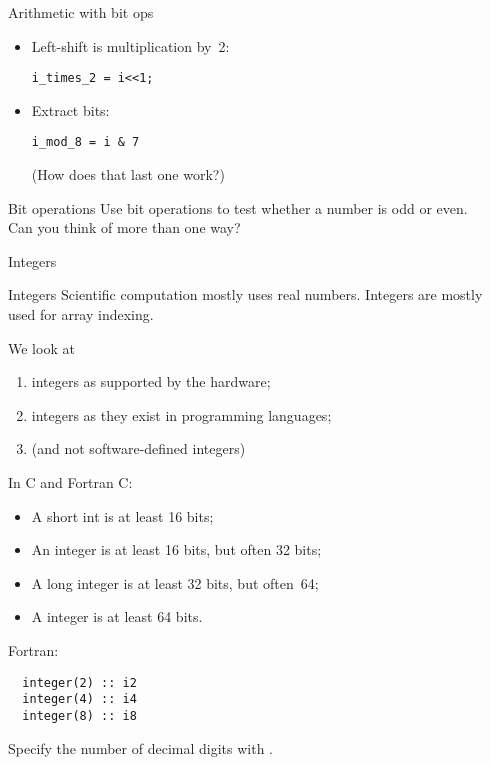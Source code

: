 \begin{numberedframe}{Arithmetic with bit ops}
  \begin{itemize}
  \item Left-shift is multiplication by~2:\\
\begin{lstlisting}
i_times_2 = i<<1;
\end{lstlisting}
\item Extract bits:
\begin{lstlisting}
i_mod_8 = i & 7
\end{lstlisting}
(How does that last one work?)
  \end{itemize}

\end{numberedframe}

\begin{exercise}{Bit operations}
  \label{ex:bit-even}
  Use bit operations to test whether a number is odd or even.\\
  Can you think of more than one way?
\end{exercise}

 {Integers}

\begin{numberedframe}{Integers}
Scientific computation mostly uses real numbers. Integers
are mostly used for array indexing.

We look at
\begin{enumerate}
\item integers as supported by the hardware;
\item integers as they exist in programming languages;
\item (and not software-defined integers)
\end{enumerate}
\end{numberedframe}

\begin{numberedframe}{In C and Fortran}
  C:
\begin{itemize}
\item A short int is at least 16 bits;
\item An integer is at least 16 bits, but often 32 bits;
\item A long integer is at least 32 bits, but often~64;
\item A  integer is at least 64 bits.
\end{itemize}

Fortran:
\lstset{language=Fortran}
\begin{lstlisting}
  integer(2) :: i2
  integer(4) :: i4
  integer(8) :: i8  
\end{lstlisting}
Specify the number of decimal digits with .
\lstset{language=C}

\end{numberedframe}

